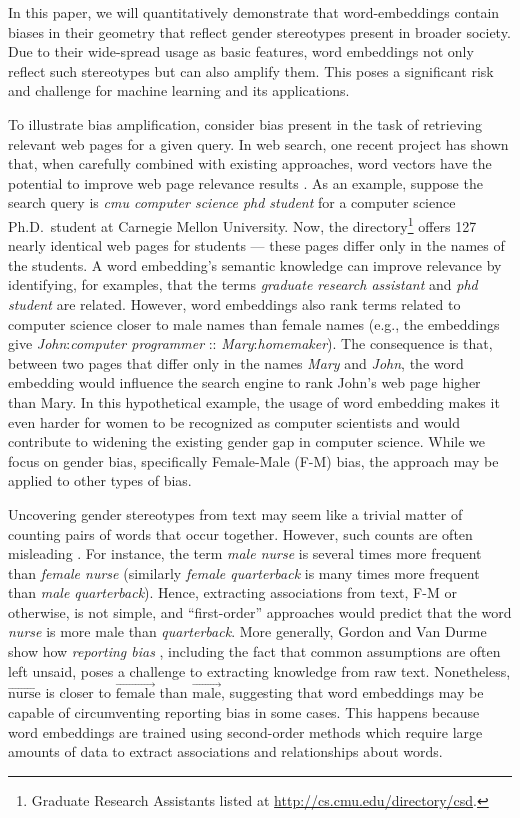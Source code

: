 \documentclass{article}
\newcommand{\wvec}[1]{\overrightarrow{\text{#1}}}
\begin{document}
In this paper, we will quantitatively demonstrate that word-embeddings contain biases in their geometry that reflect gender stereotypes present in broader society. Due to their wide-spread usage as basic features, word embeddings not only reflect such stereotypes but can also amplify them. This poses a significant risk and challenge for machine learning and its applications. 

To illustrate bias amplification, consider bias present in the task of retrieving relevant web pages for a given query. In web search, one recent project has shown that, when carefully combined with existing approaches, word vectors have the potential to improve web page relevance results \cite{NMCC16}. As an example, suppose the search query is {\em cmu computer science phd student} for a computer science Ph.D.\ student at Carnegie Mellon University. Now, the directory\footnote{Graduate Research Assistants listed at \url{http://cs.cmu.edu/directory/csd}.} offers 127 nearly identical web pages for students --- these pages differ only in the names of the students. A word embedding's semantic knowledge can improve relevance by identifying, for examples, that the terms {\em graduate research assistant} and {\em phd student} are related. However, word embeddings also rank terms related to computer science closer to male names than female names (e.g., the embeddings give \emph{John}:\emph{computer programmer} :: \emph{Mary}:{\em homemaker}). The consequence is that, between two pages that differ only in the names \emph{Mary} and \emph{John}, the word embedding would influence the search engine to rank John's web page higher than Mary. In this hypothetical example, the usage of word embedding makes it even harder for women to be recognized as computer scientists and would contribute to widening the existing gender gap in computer science. While we focus on gender bias, specifically Female-Male (F-M) bias, the approach may be applied to other types of bias.  

Uncovering gender stereotypes from text may seem like a trivial matter of counting pairs of words that occur together. However, such counts are often misleading \cite{gordon2013reporting}. For instance, the term {\em male nurse} is several times more frequent than {\em female nurse} (similarly {\em female quarterback} is many times more frequent than {\em male quarterback}). Hence, extracting associations from text, F-M or otherwise, is not simple, and ``first-order'' approaches would predict that the word {\em nurse} is more male than {\em quarterback}. More generally, Gordon and Van Durme show how {\em reporting bias} \cite{gordon2013reporting}, including the fact that common assumptions are often left unsaid, poses a challenge to extracting knowledge from raw text. Nonetheless, $\wvec{nurse}$ is closer to $\wvec{female}$ than $\wvec{male}$, suggesting that word embeddings may be capable of circumventing reporting bias in some cases.  This happens because word embeddings are trained using second-order methods which require large amounts of data to extract associations and relationships about words. 
\end{document}
